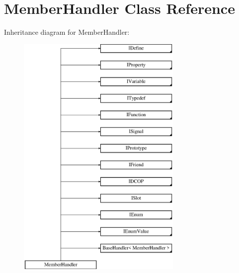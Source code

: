 \hypertarget{class_member_handler}{}\section{Member\+Handler Class Reference}
\label{class_member_handler}
Inheritance diagram for Member\+Handler\+:\begin{figure}[H]
\begin{center}
\leavevmode
\includegraphics[height=12.000000cm]{class_member_handler}
\end{center}
\end{figure}
